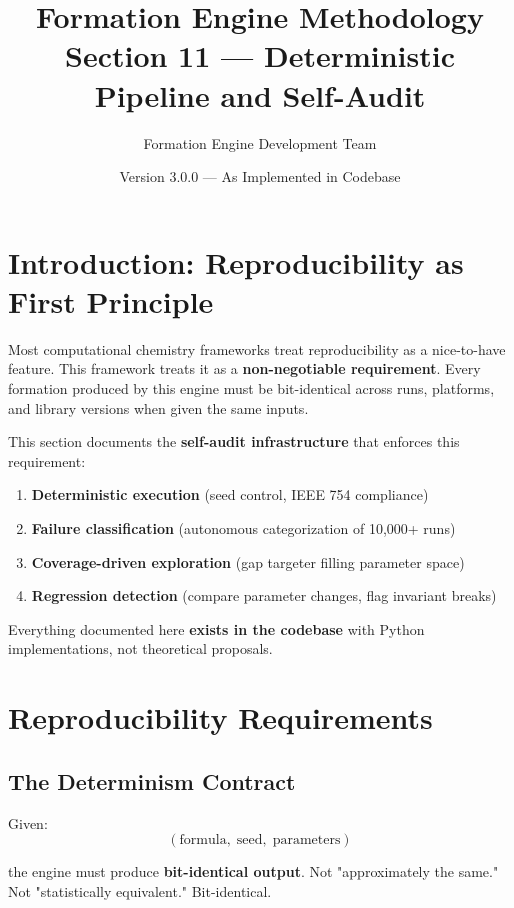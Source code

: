 \documentclass[11pt]{article}
\title{\textbf{Formation Engine Methodology} \\
\Large Section 11 — Deterministic Pipeline and Self-Audit}
\author{Formation Engine Development Team}
\date{Version 3.0.0 — As Implemented in Codebase}
\begin{document}
\maketitle

\section{Introduction: Reproducibility as First Principle}

Most computational chemistry frameworks treat reproducibility as a nice-to-have feature. This framework treats it as a \textbf{non-negotiable requirement}. Every formation produced by this engine must be bit-identical across runs, platforms, and library versions when given the same inputs.

This section documents the \textbf{self-audit infrastructure} that enforces this requirement:

\begin{enumerate}
\item \textbf{Deterministic execution} (seed control, IEEE 754 compliance)
\item \textbf{Failure classification} (autonomous categorization of 10,000+ runs)
\item \textbf{Coverage-driven exploration} (gap targeter filling parameter space)
\item \textbf{Regression detection} (compare parameter changes, flag invariant breaks)
\end{enumerate}

Everything documented here \textbf{exists in the codebase} with Python implementations, not theoretical proposals.

\section{Reproducibility Requirements}

\subsection{The Determinism Contract}

Given:
\begin{equation}
(\text{formula}, \; \text{seed}, \; \text{parameters})
\end{equation}

the engine must produce \textbf{bit-identical output}. Not "approximately the same." Not "statistically equivalent." Bit-identical.
\end{document}
